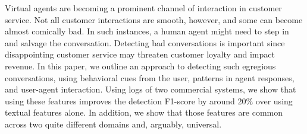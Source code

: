 Virtual agents are becoming a prominent channel of interaction in customer service. Not all customer interactions are smooth, however, and some can become almost comically bad. In such instances, a human agent might need to step in and salvage the conversation. Detecting bad conversations is important since disappointing customer service may threaten customer loyalty and impact revenue. In this paper, we outline an approach to detecting such egregious conversations, using behavioral cues from the user, patterns in agent responses, and user-agent interaction. Using logs of two commercial systems, we show that using these features improves the detection F1-score by around 20\% over using textual features alone. In addition, we show that those features are common across two quite different domains and, arguably, universal.
